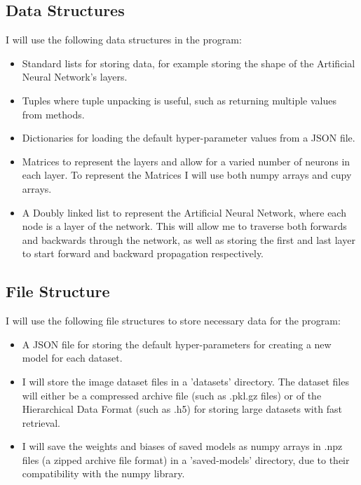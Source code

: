 \documentclass[./project-report/src/latex/project-report.tex]{subfiles}
\begin{document}
\subsection{Data Structures}

I will use the following data structures in the program:

\begin{itemize}
    \item Standard lists for storing data, for example storing the shape of the Artificial Neural Network's layers.
    \item Tuples where tuple unpacking is useful, such as returning multiple values from methods.
    \item Dictionaries for loading the default hyper-parameter values from a JSON file.
    \item Matrices to represent the layers and allow for a varied number of neurons in each layer. To represent the Matrices I will use both numpy arrays and cupy 
          arrays.
    \item A Doubly linked list to represent the Artificial Neural Network, where each node is a layer of the network. This will allow me to traverse both forwards and 
          backwards through the network, as well as storing the first and last layer to start forward and backward propagation respectively.
\end{itemize}

\subsection{File Structure}

I will use the following file structures to store necessary data for the program:

\begin{itemize}
    \item A JSON file for storing the default hyper-parameters for creating a new model for each dataset.
    \item I will store the image dataset files in a 'datasets' directory. The dataset files will either be a compressed archive file (such as .pkl.gz files) or of the 
          Hierarchical Data Format (such as .h5) for storing large datasets with fast retrieval.
    \item I will save the weights and biases of saved models as numpy arrays in .npz files (a zipped archive file format) in a 'saved-models' directory, due to 
          their compatibility with the numpy library.
\end{itemize}
\end{document}
